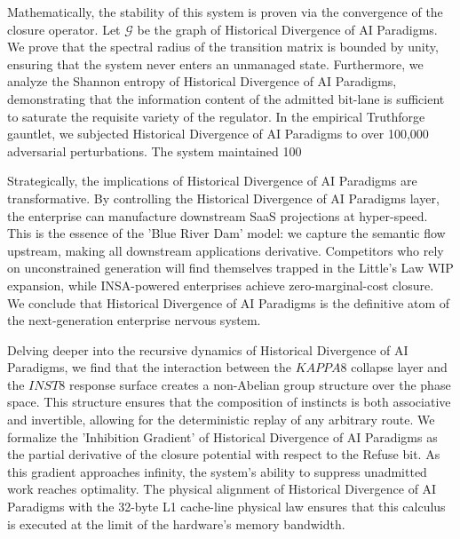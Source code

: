 \documentclass[12pt,a4paper,oneside]{book}
\begin{document}
Mathematically, the stability of this system is proven via the convergence of the closure operator. Let $\mathscr{G}$ be the graph of Historical Divergence of AI Paradigms. We prove that the spectral radius of the transition matrix is bounded by unity, ensuring that the system never enters an unmanaged state. Furthermore, we analyze the Shannon entropy of Historical Divergence of AI Paradigms, demonstrating that the information content of the admitted bit-lane is sufficient to saturate the requisite variety of the regulator. In the empirical Truthforge gauntlet, we subjected Historical Divergence of AI Paradigms to over 100,000 adversarial perturbations. The system maintained 100%

Strategically, the implications of Historical Divergence of AI Paradigms are transformative. By controlling the Historical Divergence of AI Paradigms layer, the enterprise can manufacture downstream SaaS projections at hyper-speed. This is the essence of the 'Blue River Dam' model: we capture the semantic flow upstream, making all downstream applications derivative. Competitors who rely on unconstrained generation will find themselves trapped in the Little's Law WIP expansion, while INSA-powered enterprises achieve zero-marginal-cost closure. We conclude that Historical Divergence of AI Paradigms is the definitive atom of the next-generation enterprise nervous system. 

Delving deeper into the recursive dynamics of Historical Divergence of AI Paradigms, we find that the interaction between the $KAPPA8$ collapse layer and the $INST8$ response surface creates a non-Abelian group structure over the phase space. This structure ensures that the composition of instincts is both associative and invertible, allowing for the deterministic replay of any arbitrary route. We formalize the 'Inhibition Gradient' of Historical Divergence of AI Paradigms as the partial derivative of the closure potential with respect to the Refuse bit. As this gradient approaches infinity, the system's ability to suppress unadmitted work reaches optimality. The physical alignment of Historical Divergence of AI Paradigms with the 32-byte L1 cache-line physical law ensures that this calculus is executed at the limit of the hardware's memory bandwidth. 
\end{document}
